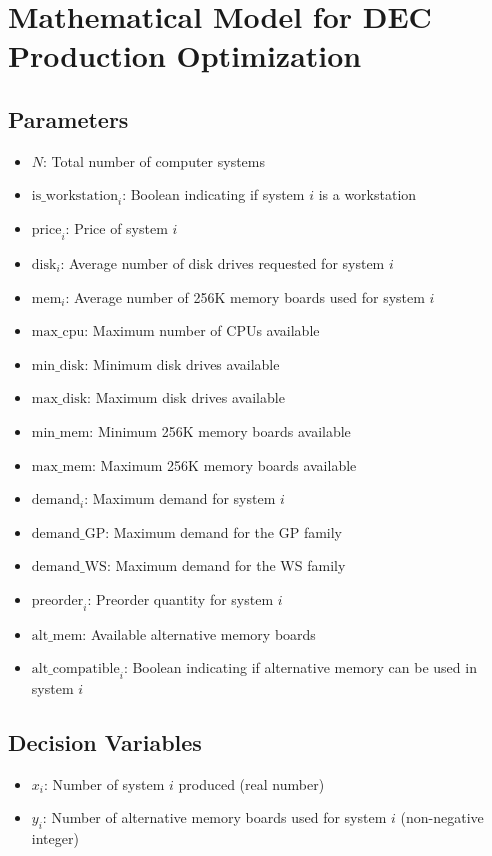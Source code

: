 \documentclass{article}
\begin{document}
\section*{Mathematical Model for DEC Production Optimization}

\subsection*{Parameters}
\begin{itemize}
    \item \( N \): Total number of computer systems
    \item \( \text{is\_workstation}_i \): Boolean indicating if system \( i \) is a workstation
    \item \( \text{price}_i \): Price of system \( i \)
    \item \( \text{disk}_i \): Average number of disk drives requested for system \( i \)
    \item \( \text{mem}_i \): Average number of 256K memory boards used for system \( i \)
    \item \( \text{max\_cpu} \): Maximum number of CPUs available
    \item \( \text{min\_disk} \): Minimum disk drives available
    \item \( \text{max\_disk} \): Maximum disk drives available
    \item \( \text{min\_mem} \): Minimum 256K memory boards available
    \item \( \text{max\_mem} \): Maximum 256K memory boards available
    \item \( \text{demand}_i \): Maximum demand for system \( i \)
    \item \( \text{demand\_GP} \): Maximum demand for the GP family
    \item \( \text{demand\_WS} \): Maximum demand for the WS family
    \item \( \text{preorder}_i \): Preorder quantity for system \( i \)
    \item \( \text{alt\_mem} \): Available alternative memory boards
    \item \( \text{alt\_compatible}_i \): Boolean indicating if alternative memory can be used in system \( i \)
\end{itemize}

\subsection*{Decision Variables}
\begin{itemize}
    \item \( x_i \): Number of system \( i \) produced (real number)
    \item \( y_i \): Number of alternative memory boards used for system \( i \) (non-negative integer)
\end{itemize}
\end{document}
